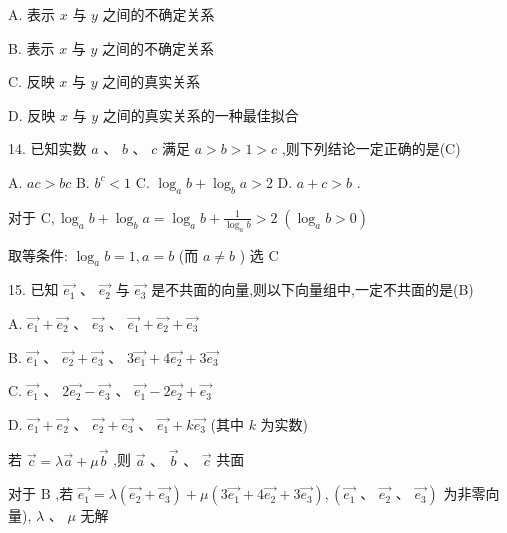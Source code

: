 \documentclass[10pt]{article}
\begin{document}
A. 表示 \(x\) 与 \(y\) 之间的不确定关系

B. 表示 \(x\) 与 \(y\) 之间的不确定关系

C. 反映 \(x\) 与 \(y\) 之间的真实关系

D. 反映 \(x\) 与 \(y\) 之间的真实关系的一种最佳拟合

14. 已知实数 \(a\text{ 、 }b\text{ 、 }c\) 满足 \(a > b > 1 > c\) ,则下列结论一定正确的是(C)

A. \({ac} > {bc}\) B. \({b}^{c} < 1\) C. \({\log }_{a}b + {\log }_{b}a > 2\) D. \(a + c > b\) .

对于 \(\mathrm{C},{\log }_{a}b + {\log }_{b}a = {\log }_{a}b + \frac{1}{{\log }_{a}b} > 2\;\left( {{\log }_{a}b > 0}\right)\)

取等条件: \({\log }_{a}b = 1,a = b\) (而 \(a \neq  b\) ) 选 \(\mathrm{C}\)

15. 已知 \(\overrightarrow{{e}_{1}}\text{ 、 }\overrightarrow{{e}_{2}}\) 与 \(\overrightarrow{{e}_{3}}\) 是不共面的向量,则以下向量组中,一定不共面的是(B)

A. \(\overrightarrow{{e}_{1}} + \overrightarrow{{e}_{2}}\text{ 、 }\overrightarrow{{e}_{3}}\text{ 、 }\overrightarrow{{e}_{1}} + \overrightarrow{{e}_{2}} + \overrightarrow{{e}_{3}}\)

B. \(\overrightarrow{{e}_{1}}\text{ 、 }\overrightarrow{{e}_{2}} + \overrightarrow{{e}_{3}}\text{ 、 }3\overrightarrow{{e}_{1}} + 4\overrightarrow{{e}_{2}} + 3\overrightarrow{{e}_{3}}\)

C. \(\overrightarrow{{e}_{1}}\text{ 、 }2\overrightarrow{{e}_{2}} - \overrightarrow{{e}_{3}}\text{ 、 }\overrightarrow{{e}_{1}} - 2\overrightarrow{{e}_{2}} + \overrightarrow{{e}_{3}}\)

D. \(\overrightarrow{{e}_{1}} + \overrightarrow{{e}_{2}}\text{ 、 }\overrightarrow{{e}_{2}} + \overrightarrow{{e}_{3}}\text{ 、 }\overrightarrow{{e}_{1}} + k\overrightarrow{{e}_{3}}\) (其中 \(k\) 为实数)

若 \(\overrightarrow{c} = \lambda \overrightarrow{a} + \mu \overrightarrow{b}\) ,则 \(\overrightarrow{a}\text{ 、 }\overrightarrow{b}\text{ 、 }\overrightarrow{c}\) 共面

对于 \(\mathrm{B}\) ,若 \(\overrightarrow{{e}_{1}} = \lambda \left( {\overrightarrow{{e}_{2}} + \overrightarrow{{e}_{3}}}\right)  + \mu \left( {3\overrightarrow{{e}_{1}} + 4\overrightarrow{{e}_{2}} + 3\overrightarrow{{e}_{3}}}\right) ,\left( {\overrightarrow{{e}_{1}}\text{ 、 }\overrightarrow{{e}_{2}}\text{ 、 }\overrightarrow{{e}_{3}}}\right)\) 为非零向量), \(\lambda \text{ 、 }\mu\) 无解
\end{document}
